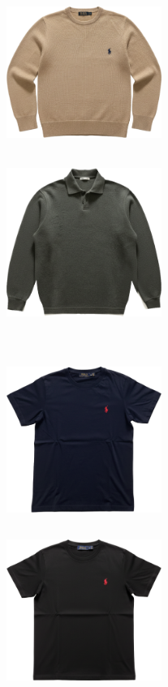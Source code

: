 \documentclass[10pt]{article}
\begin{document}
\begin{minipage}[c][50.60mm][c]{50.60mm}
\includegraphics[width=50.60mm,height=50.60mm,keepaspectratio]{assets/midlayer/beige-polo-crewneck.png}\
\end{minipage} \hspace*{6.00mm} \begin{minipage}[c][50.60mm][c]{50.60mm}\centering
\includegraphics[width=50.60mm,height=50.60mm,keepaspectratio]{assets/midlayer/green-polo-longsleeve.png}\
\end{minipage}\
\vspace*{6.00mm}\
\begin{minipage}[c][50.60mm][c]{50.60mm}\centering
\includegraphics[width=50.60mm,height=50.60mm,keepaspectratio]{assets/tees/navy-polo-tee-red-horse.png}\
\end{minipage} \hspace*{6.00mm} \begin{minipage}[c][50.60mm][c]{50.60mm}\centering
\includegraphics[width=50.60mm,height=50.60mm,keepaspectratio]{assets/tees/black-polo-tee-red-horse.png}\
\end{minipage}\
\vspace*{6.00mm}\
\newpage
\end{document}
